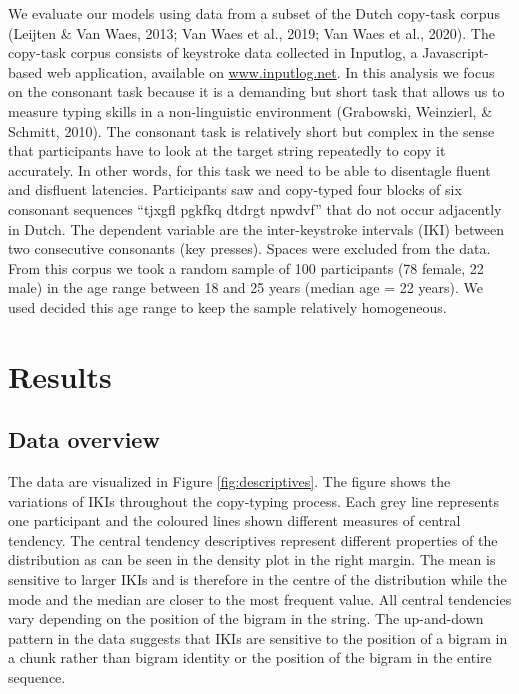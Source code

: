 \documentclass[english,jou,floatsintext]{apa7}
\begin{document}
We evaluate our models using data from a subset of the Dutch copy-task corpus (Leijten \& Van Waes, 2013; Van Waes et al., 2019; Van Waes et al., 2020). The copy-task corpus consists of keystroke data collected in Inputlog, a Javascript-based web application, available on \url{www.inputlog.net}. In this analysis we focus on the consonant task because it is a demanding but short task that allows us to measure typing skills in a non-linguistic environment (Grabowski, Weinzierl, \& Schmitt, 2010). The consonant task is relatively short but complex in the sense that participants have to look at the target string repeatedly to copy it accurately. In other words, for this task we need to be able to disentagle fluent and disfluent latencies. Participants saw and copy-typed four blocks of six consonant sequences \enquote{tjxgfl pgkfkq dtdrgt npwdvf} that do not occur adjacently in Dutch. The dependent variable are the inter-keystroke intervals (IKI) between two consecutive consonants (key presses). Spaces were excluded from the data. From this corpus we took a random sample of 100 participants (78 female, 22 male) in the age range between 18 and 25 years (median age = 22 years). We used decided this age range to keep the sample relatively homogeneous.

\hypertarget{results}{%
\section{Results}\label{results}}

\hypertarget{data-overview}{%
\subsection{Data overview}\label{data-overview}}

The data are visualized in Figure \ref{fig:descriptives}. The figure shows the variations of IKIs throughout the copy-typing process. Each grey line represents one participant and the coloured lines shown different measures of central tendency. The central tendency descriptives represent different properties of the distribution as can be seen in the density plot in the right margin. The mean is sensitive to larger IKIs and is therefore in the centre of the distribution while the mode and the median are closer to the most frequent value. All central tendencies vary depending on the position of the bigram in the string. The up-and-down pattern in the data suggests that IKIs are sensitive to the position of a bigram in a chunk rather than bigram identity or the position of the bigram in the entire sequence.
\end{document}
